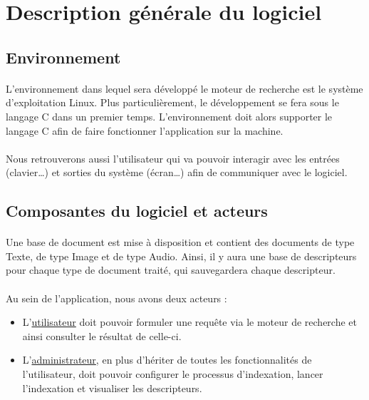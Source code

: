 \documentclass[../main.tex]{subfiles}
\begin{document}
    \section{Description générale du logiciel}
    \subsection{Environnement}

    \paragraph{}
    L’environnement dans lequel sera développé le moteur de recherche est le système d’exploitation Linux. Plus particulièrement, le développement se fera sous le langage C dans un premier temps. L’environnement doit alors supporter le langage C afin de faire fonctionner l’application sur la machine.

    \paragraph{}
    Nous retrouverons aussi l’utilisateur qui va pouvoir interagir avec les entrées (clavier…) et sorties du système (écran…) afin de communiquer avec le logiciel.

    \subsection{Composantes du logiciel et acteurs}

    \paragraph{}
    Une base de document est mise à disposition et contient des documents de type Texte, de type Image et de type Audio. Ainsi, il y aura une base de descripteurs pour chaque type de document traité, qui sauvegardera chaque descripteur.

    \paragraph{}
    Au sein de l’application, nous avons deux acteurs :
    \begin{itemize}
        \item L’\underline{utilisateur} doit pouvoir formuler une requête via le moteur de recherche et ainsi consulter le résultat de celle-ci.
        \item L’\underline{administrateur}, en plus d’hériter de toutes les fonctionnalités de l’utilisateur, doit pouvoir configurer le processus d’indexation, lancer l’indexation et visualiser les descripteurs.
    \end{itemize}
\end{document}
